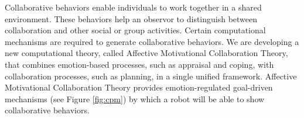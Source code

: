 \documentclass[letterpaper]{article}
\begin{document}
Collaborative behaviors enable individuals to work together in a shared
environment. These behaviors help an observor to distinguish between
collaboration and other social or group activities. Certain computational
mechanisms are required to generate collaborative behaviors. We are developing a
new computational theory, called Affective Motivational Collaboration Theory,
that combines emotion-based processes, such as appraisal and coping, with
collaboration processes, such as planning, in a single unified framework.
Affective Motivational Collaboration Theory provides emotion-regulated
goal-driven mechanisms (see Figure \ref{fig:cpm}) by which a robot will be able
to show collaborative behaviors.



\end{document}

